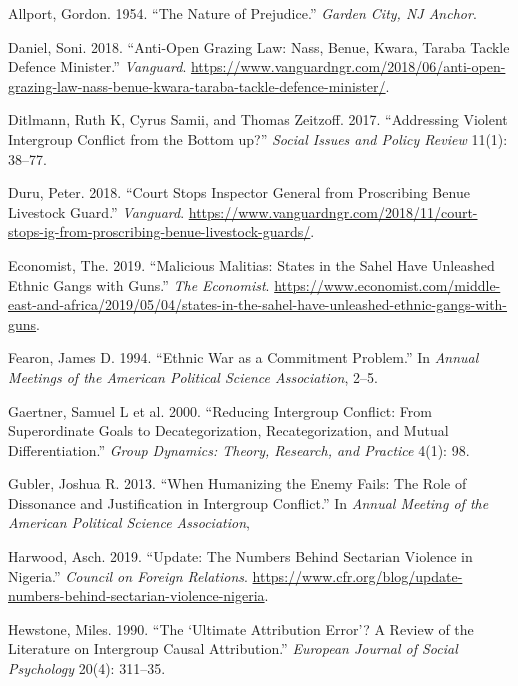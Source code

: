 \documentclass[11pt]{article}
\begin{document}
\leavevmode\hypertarget{ref-allport1954prejudice}{}%
Allport, Gordon. 1954. ``The Nature of Prejudice.'' \emph{Garden City,
NJ Anchor}.

\leavevmode\hypertarget{ref-daniel2018anti}{}%
Daniel, Soni. 2018. ``Anti-Open Grazing Law: Nass, Benue, Kwara, Taraba
Tackle Defence Minister.'' \emph{Vanguard}.
\url{https://www.vanguardngr.com/2018/06/anti-open-grazing-law-nass-benue-kwara-taraba-tackle-defence-minister/}.

\leavevmode\hypertarget{ref-ditlmann2017addressing}{}%
Ditlmann, Ruth K, Cyrus Samii, and Thomas Zeitzoff. 2017. ``Addressing
Violent Intergroup Conflict from the Bottom up?'' \emph{Social Issues
and Policy Review} 11(1): 38--77.

\leavevmode\hypertarget{ref-duru2018court}{}%
Duru, Peter. 2018. ``Court Stops Inspector General from Proscribing
Benue Livestock Guard.'' \emph{Vanguard}.
\url{https://www.vanguardngr.com/2018/11/court-stops-ig-from-proscribing-benue-livestock-guards/}.

\leavevmode\hypertarget{ref-economist2019militias}{}%
Economist, The. 2019. ``Malicious Malitias: States in the Sahel Have
Unleashed Ethnic Gangs with Guns.'' \emph{The Economist}.
\url{https://www.economist.com/middle-east-and-africa/2019/05/04/states-in-the-sahel-have-unleashed-ethnic-gangs-with-guns}.

\leavevmode\hypertarget{ref-fearon1994ethnic}{}%
Fearon, James D. 1994. ``Ethnic War as a Commitment Problem.'' In
\emph{Annual Meetings of the American Political Science Association},
2--5.

\leavevmode\hypertarget{ref-gaertner2000reducing}{}%
Gaertner, Samuel L et al. 2000. ``Reducing Intergroup Conflict: From
Superordinate Goals to Decategorization, Recategorization, and Mutual
Differentiation.'' \emph{Group Dynamics: Theory, Research, and Practice}
4(1): 98.

\leavevmode\hypertarget{ref-gubler2013humanizing}{}%
Gubler, Joshua R. 2013. ``When Humanizing the Enemy Fails: The Role of
Dissonance and Justification in Intergroup Conflict.'' In \emph{Annual
Meeting of the American Political Science Association},

\leavevmode\hypertarget{ref-council2019nigeria}{}%
Harwood, Asch. 2019. ``Update: The Numbers Behind Sectarian Violence in
Nigeria.'' \emph{Council on Foreign Relations}.
\url{https://www.cfr.org/blog/update-numbers-behind-sectarian-violence-nigeria}.

\leavevmode\hypertarget{ref-hewstone1990ultimate}{}%
Hewstone, Miles. 1990. ``The `Ultimate Attribution Error'? A Review of
the Literature on Intergroup Causal Attribution.'' \emph{European
Journal of Social Psychology} 20(4): 311--35.
\end{document}
